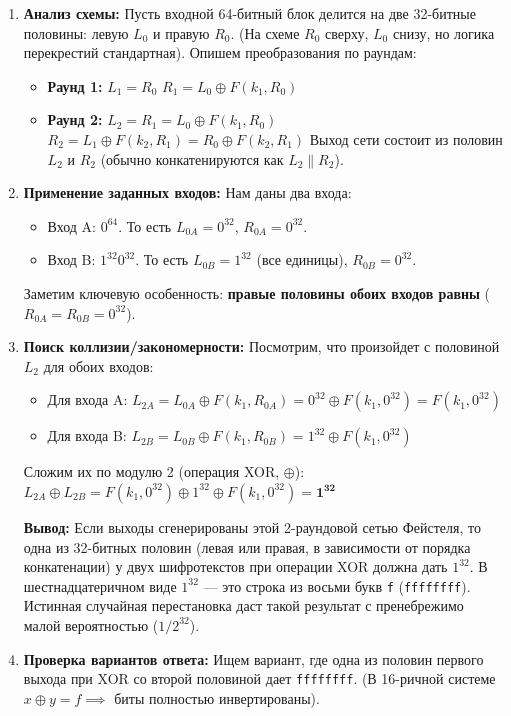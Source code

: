 \begin{enumerate}
\def\labelenumi{\arabic{enumi}.}
\item
  \textbf{Анализ схемы:} Пусть входной 64-битный блок делится на две 32-битные половины: левую \(L_0\) и правую \(R_0\). (На схеме \(R_0\) сверху, \(L_0\) снизу, но логика перекрестий стандартная). Опишем преобразования по раундам:

  \begin{itemize}
  \tightlist
  \item
    \textbf{Раунд 1:} \(L_1 = R_0\) \(R_1 = L_0 \oplus F(k_1, R_0)\)
  \item
    \textbf{Раунд 2:} \(L_2 = R_1 = L_0 \oplus F(k_1, R_0)\) \(R_2 = L_1 \oplus F(k_2, R_1) = R_0 \oplus F(k_2, R_1)\) Выход сети состоит из половин \(L_2\) и \(R_2\) (обычно конкатенируются как \(L_2 \parallel R_2\)).
  \end{itemize}
\item
  \textbf{Применение заданных входов:} Нам даны два входа:

  \begin{itemize}
  \tightlist
  \item
    Вход A: \(0^{64}\). То есть \(L_{0A} = 0^{32}\), \(R_{0A} = 0^{32}\).
  \item
    Вход B: \(1^{32}0^{32}\). То есть \(L_{0B} = 1^{32}\) (все единицы), \(R_{0B} = 0^{32}\).
  \end{itemize}

  Заметим ключевую особенность: \textbf{правые половины обоих входов равны} (\(R_{0A} = R_{0B} = 0^{32}\)).
\item
  \textbf{Поиск коллизии/закономерности:} Посмотрим, что произойдет с половиной \(L_2\) для обоих входов:

  \begin{itemize}
  \tightlist
  \item
    Для входа A: \(L_{2A} = L_{0A} \oplus F(k_1, R_{0A}) = 0^{32} \oplus F(k_1, 0^{32}) = F(k_1, 0^{32})\)
  \item
    Для входа B: \(L_{2B} = L_{0B} \oplus F(k_1, R_{0B}) = 1^{32} \oplus F(k_1, 0^{32})\)
  \end{itemize}

  Сложим их по модулю 2 (операция XOR, \(\oplus\)): \(L_{2A} \oplus L_{2B} = F(k_1, 0^{32}) \oplus 1^{32} \oplus F(k_1, 0^{32}) = \mathbf{1^{32}}\)

  \textbf{Вывод:} Если выходы сгенерированы этой 2-раундовой сетью Фейстеля, то одна из 32-битных половин (левая или правая, в зависимости от порядка конкатенации) у двух шифротекстов при операции XOR должна дать \(1^{32}\). В шестнадцатеричном виде \(1^{32}\) --- это строка из восьми букв \texttt{f} (\texttt{ffffffff}). Истинная случайная перестановка даст такой результат с пренебрежимо малой вероятностью (\(1/2^{32}\)).
\item
  \textbf{Проверка вариантов ответа:} Ищем вариант, где одна из половин первого выхода при XOR со второй половиной дает \texttt{ffffffff}. (В 16-ричной системе \(x \oplus y = f \implies\) биты полностью инвертированы).


\end{enumerate}
